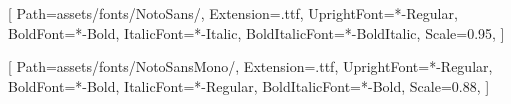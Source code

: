\usepackage{fontspec}
\usepackage{longtable}
\usepackage{booktabs}
\usepackage{fancyvrb}


\setmainfont{NotoSans}[
  Path=assets/fonts/NotoSans/,
  Extension=.ttf,
  UprightFont=*-Regular,
  BoldFont=*-Bold,
  ItalicFont=*-Italic,
  BoldItalicFont=*-BoldItalic,
  Scale=0.95,
]

\setmonofont{NotoSansMono}[
  Path=assets/fonts/NotoSansMono/,
  Extension=.ttf,
  UprightFont=*-Regular,
  BoldFont=*-Bold,
  ItalicFont=*-Regular,
  BoldItalicFont=*-Bold,
  Scale=0.88,
]

